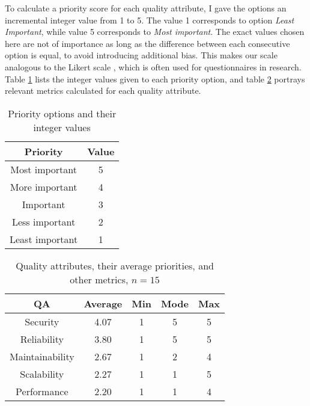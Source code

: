 \documentclass[utf8,english]{gradu3}
\begin{document}
To calculate a priority score for each quality attribute, I gave the options an
incremental integer value from 1 to 5. The value 1 corresponds to option
\textit{Least Important}, while value 5 corresponds to \textit{Most important}.
The exact values chosen here are not of importance as long as the difference
between each consecutive option is equal, to avoid introducing additional
bias. This makes our scale analogous to the Likert scale \parencite{Likert}, which is
often used for questionnaires in research.
Table \ref{table:priorities1} lists the integer values given to each priority option,
and table \ref{table:priorities2} portrays relevant metrics calculated for each quality attribute.

\begin{table}[!h]
  \begin{center}
    \caption{Priority options and their integer values}
    \label{table:priorities1}
    \begin{tabular}{|c|c|}
      \hline
      \textbf{Priority} & \textbf{Value} \\
      \hline
      Most important    & 5              \\
      More important    & 4              \\
      Important         & 3              \\
      Less important    & 2              \\
      Least important   & 1              \\
      \hline
    \end{tabular}
  \end{center}
\end{table}

\begin{table}[!h]
  \begin{center}
    \caption{Quality attributes, their average priorities, and other metrics, $n = 15$}
    \label{table:priorities2}
    \begin{tabular}{|c|c|c|c|c|}
      \hline
      \textbf{QA}     & \textbf{Average} & \textbf{Min} & \textbf{Mode} & \textbf{Max} \\
      \hline
      Security        & 4.07             & 1            & 5             & 5            \\
      Reliability     & 3.80             & 1            & 5             & 5            \\
      Maintainability & 2.67             & 1            & 2             & 4            \\
      Scalability     & 2.27             & 1            & 1             & 5            \\
      Performance     & 2.20             & 1            & 1             & 4            \\
      \hline
    \end{tabular}
  \end{center}
\end{table}
\end{document}

